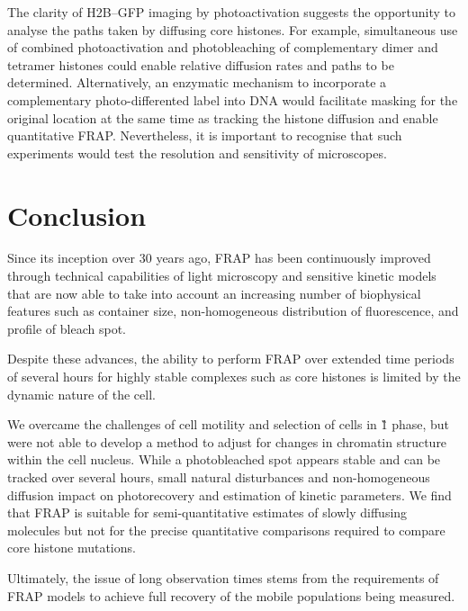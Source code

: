     The clarity of H2B--GFP imaging by photoactivation
    suggests the opportunity to analyse the
    paths taken by diffusing core histones.
    For example, simultaneous use of combined
    photoactivation and photobleaching
    of complementary dimer and tetramer histones could
    enable relative diffusion rates and paths to be determined.
    Alternatively, an enzymatic mechanism to incorporate a
    complementary photo-differented label
    into DNA  would facilitate masking for
    the original location at the same time as tracking the histone diffusion
    and enable quantitative FRAP.
    Nevertheless, it is important to recognise
    that such experiments would test the
    resolution and sensitivity of microscopes.

\section{Conclusion}

    Since its inception over 30 years ago, FRAP has been continuously
    improved
    through technical capabilities of light microscopy
    and sensitive kinetic models that are now able to take into account
    an increasing number of biophysical features such as container size,
    non-homogeneous distribution of fluorescence, and profile of bleach spot.

    Despite these advances, the ability to perform FRAP
    over extended time periods of several hours for highly stable complexes
    such as core histones is limited by the dynamic nature of the cell.

    We overcame the challenges of cell motility
    and selection of cells in \G1{} phase,
    but were not able to develop a method to adjust
    for changes in chromatin structure within the cell nucleus.
    While a photobleached spot appears stable and
    can be tracked over several hours,
    small natural disturbances and non-homogeneous diffusion
    impact on photorecovery
    and estimation of kinetic parameters.
    We find that FRAP is suitable for semi-quantitative
    estimates of slowly diffusing molecules
    but not for the precise quantitative comparisons
    required to compare core histone mutations.

    Ultimately, the issue of long observation times stems from the
    requirements of FRAP models to achieve full recovery of the mobile
    populations being measured.

